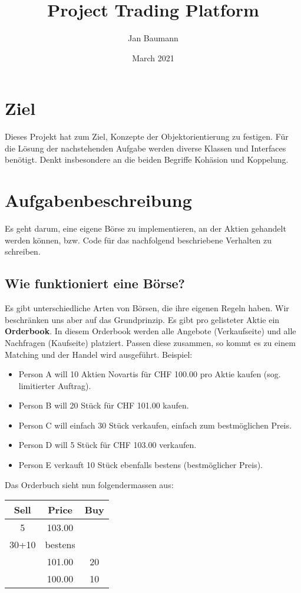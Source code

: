 \documentclass{article}
\title{Project Trading Platform}
\author{Jan Baumann }
\date{March 2021}
\begin{document}
\maketitle

\section{Ziel}
Dieses Projekt hat zum Ziel, Konzepte der Objektorientierung zu festigen. Für die Lösung der nachstehenden Aufgabe werden diverse Klassen und Interfaces benötigt. Denkt insbesondere an die beiden Begriffe Kohäsion und Koppelung.

\section{Aufgabenbeschreibung}
Es geht darum, eine eigene Börse zu implementieren, an der Aktien gehandelt werden können, bzw. Code für das nachfolgend beschriebene Verhalten zu schreiben.

\subsection{Wie funktioniert eine Börse?}
Es gibt unterschiedliche Arten von Börsen, die ihre eigenen Regeln haben. Wir beschränken uns aber auf das Grundprinzip. Es gibt pro gelisteter Aktie ein \textbf{Orderbook}. In diesem Orderbook werden alle Angebote (Verkaufseite) und alle Nachfragen (Kaufseite) platziert. Passen diese zusammen, so kommt es zu einem Matching und der Handel wird ausgeführt. Beispiel:
\begin{itemize}
    \item Person A will 10 Aktien Novartis für CHF 100.00 pro Aktie kaufen (sog. limitierter Auftrag).
    \item Person B will 20 Stück für CHF 101.00 kaufen.
    \item Person C will einfach 30 Stück verkaufen, einfach zum bestmöglichen Preis.
    \item Person D will 5 Stück für CHF 103.00 verkaufen.
    \item Person E verkauft 10 Stück ebenfalls bestens (bestmöglicher Preis).
\end{itemize}
Das Orderbuch sieht nun folgendermassen aus:

\begin{center}
    \begin{tabular}{|c|c|c|}
        \hline
        \textbf{Sell} & \textbf{Price} & \textbf{Buy} \\
        \hline
         5 & 103.00 & \\
         30+10 & bestens & \\
         & 101.00 & 20 \\
         & 100.00 & 10 \\
        \hline
    \end{tabular}
\end{center}
\end{document}
